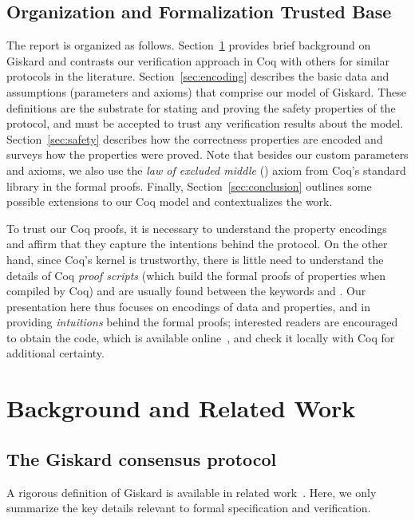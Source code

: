 \documentclass{easychair}
\begin{document}
\subsection{Organization and Formalization Trusted Base}
The report is organized as follows. Section~\ref{sec:background} provides brief background on Giskard and contrasts our verification approach in Coq with others for similar protocols in the literature.
%
Section~\ref{sec:encoding} describes the basic data and assumptions (parameters and axioms) that comprise our model of Giskard. These definitions are the substrate for stating and proving the safety properties of the protocol, and must be accepted to trust any verification results about the model. Section~\ref{sec:safety} describes how the correctness properties are encoded and surveys how the properties were proved. Note that besides our custom parameters and axioms, we also use the \emph{law of excluded middle} () axiom from Coq's standard library in the formal proofs. Finally, Section~\ref{sec:conclusion} outlines some possible extensions to our Coq model and contextualizes the work.

To trust our Coq proofs, it is necessary to understand the property encodings and affirm that they capture the intentions behind the protocol. On the other hand, since Coq's kernel is trustworthy, there is little need to understand the details of Coq \emph{proof scripts} (which build the formal proofs of properties when compiled by Coq) and are usually found between the keywords  and . Our presentation here thus focuses on encodings of data and properties, and in providing \emph{intuitions} behind the formal proofs; interested readers are encouraged to obtain the code, which is available online~\cite{CoqGiskard}, and check it locally with Coq for additional certainty.

\section{Background and Related Work}
\label{sec:background}
\subsection{The Giskard consensus protocol}
\label{sec:proto-overview}
A rigorous definition of Giskard is available in related work~\cite{GiskardSpec}. Here, we only summarize the key details relevant to formal specification and verification.
\end{document}
